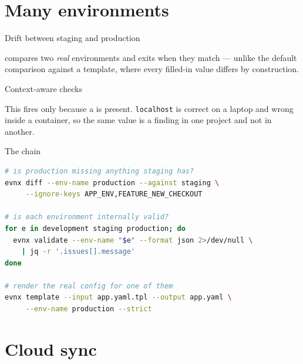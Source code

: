 \documentclass[aspectratio=169,10pt]{beamer}
\begin{document}
\section{Many environments}

\begin{frame}[fragile]{Drift between staging and production}

  {\footnotesize {} compares two \emph{real} environments and
  exits \exitzero{} when they match — unlike the default comparison against a
  template, where every filled-in value differs by construction.}
\end{frame}

\begin{frame}[fragile]{Context-aware checks}

  {\footnotesize This fires only because a  is present.
  \texttt{localhost} is correct on a laptop and wrong inside a container, so the
  same value is a finding in one project and not in another.}
\end{frame}

\begin{frame}[fragile]{The chain}
\begin{lstlisting}[style=evnxcode,language=bash]
# is production missing anything staging has?
evnx diff --env-name production --against staging \
     --ignore-keys APP_ENV,FEATURE_NEW_CHECKOUT

# is each environment internally valid?
for e in development staging production; do
  evnx validate --env-name "$e" --format json 2>/dev/null \
    | jq -r '.issues[].message'
done

# render the real config for one of them
evnx template --input app.yaml.tpl --output app.yaml \
     --env-name production --strict
\end{lstlisting}
\end{frame}

\section{Cloud sync}
\end{document}
